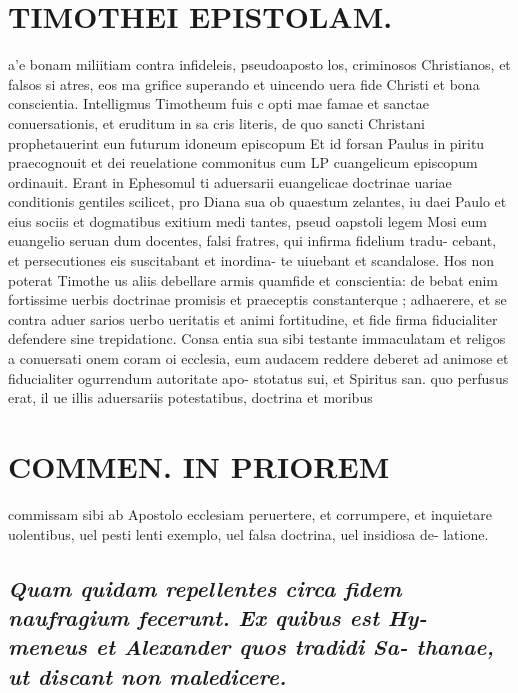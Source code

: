 \documentclass{article}
\begin{document}
\begin{pages}
\section*{TIMOTHEI EPISTOLAM. }
\marginpar{[ p.39 ]}\pstart a’e bonam miliitiam contra infideleis, pseudoaposto los, criminosos Christianos, et falsos si atres, eos ma grifice superando et uincendo uera fide Christi et bona conscientia. Intelligmus Timotheum fuis c opti mae famae et sanctae conuersationis, et eruditum in sa cris literis, de quo sancti Christani prophetauerint eun futurum idoneum episcopum Et id forsan Paulus in piritu praecognouit et dei reuelatione commonitus cum LP cuangelicum episcopum ordinauit. Erant in Ephesomul ti aduersarii euangelicae doctrinae uariae conditionis gentiles scilicet, pro Diana sua ob quaestum zelantes, iu daei Paulo et eius sociis et dogmatibus exitium medi tantes, pseud oapstoli legem Mosi eum euangelio seruan dum docentes, falsi fratres, qui infirma fidelium tradu- cebant, et persecutiones eis suscitabant et inordina- te uiuebant et scandalose. Hos non poterat Timothe us aliis debellare armis quamfide et conscientia: de bebat enim fortissime uerbis doctrinae promisis et praeceptis constanterque ; adhaerere, et se contra aduer sarios uerbo ueritatis et animi fortitudine, et fide firma fiducialiter defendere sine trepidationc. Consa entia sua sibi testante immaculatam et religos a conuersati onem coram oi ecclesia, eum audacem reddere deberet ad animose et fiducialiter ogurrendum autoritate apo- stotatus sui, et Spiritus san. quo perfusus erat, il ue illis aduersariis potestatibus, doctrina et moribus  \pend
\section*{COMMEN. IN PRIOREM }
\marginpar{[ p.40 ]}\pstart commissam sibi ab Apostolo ecclesiam peruertere, et corrumpere, et inquietare uolentibus, uel pesti lenti exemplo, uel falsa doctrina, uel insidiosa de- latione.  \pend
{}
{}
\subsection*{\textit{Quam quidam repellentes circa fidem naufragium fecerunt. Ex quibus est Hy- meneus et Alexander quos tradidi Sa- thanae, ut discant non maledicere. }}
{}

\end{pages}
\end{document}
